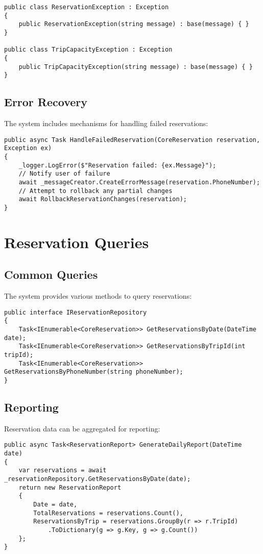 \begin{lstlisting}[language=CSharp]
public class ReservationException : Exception
{
    public ReservationException(string message) : base(message) { }
}

public class TripCapacityException : Exception
{
    public TripCapacityException(string message) : base(message) { }
}
\end{lstlisting}

\subsection{Error Recovery}
The system includes mechanisms for handling failed reservations:

\begin{lstlisting}[language=CSharp]
public async Task HandleFailedReservation(CoreReservation reservation, Exception ex)
{
    _logger.LogError($"Reservation failed: {ex.Message}");
    // Notify user of failure
    await _messageCreator.CreateErrorMessage(reservation.PhoneNumber);
    // Attempt to rollback any partial changes
    await RollbackReservationChanges(reservation);
}
\end{lstlisting}

\section{Reservation Queries}

\subsection{Common Queries}
The system provides various methods to query reservations:

\begin{lstlisting}[language=CSharp]
public interface IReservationRepository
{
    Task<IEnumerable<CoreReservation>> GetReservationsByDate(DateTime date);
    Task<IEnumerable<CoreReservation>> GetReservationsByTripId(int tripId);
    Task<IEnumerable<CoreReservation>> GetReservationsByPhoneNumber(string phoneNumber);
}
\end{lstlisting}

\subsection{Reporting}
Reservation data can be aggregated for reporting:

\begin{lstlisting}[language=CSharp]
public async Task<ReservationReport> GenerateDailyReport(DateTime date)
{
    var reservations = await _reservationRepository.GetReservationsByDate(date);
    return new ReservationReport
    {
        Date = date,
        TotalReservations = reservations.Count(),
        ReservationsByTrip = reservations.GroupBy(r => r.TripId)
            .ToDictionary(g => g.Key, g => g.Count())
    };
}
\end{lstlisting}

